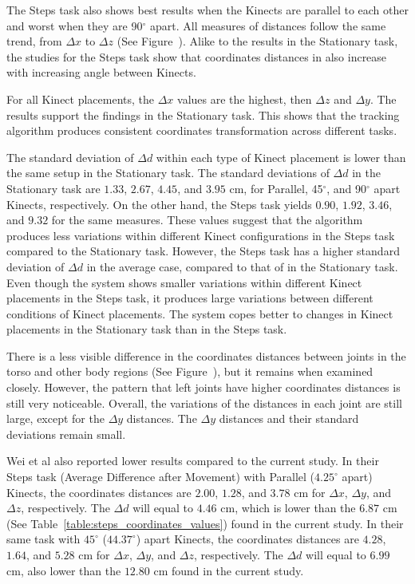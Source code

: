 The Steps task also shows best results when the Kinects are parallel to each other and worst when they are 90$^{\circ}$ apart. All measures of distances follow the same trend, from $\Delta x$ to $\Delta z$ (See Figure~). Alike to the results in the Stationary task, the studies for the Steps task show that coordinates distances in also increase with increasing angle between Kinects.

For all Kinect placements, the $\Delta x$ values are the highest, then $\Delta z$ and $\Delta y$. The results support the findings in the Stationary task. This shows that the tracking algorithm produces consistent coordinates transformation across different tasks.

The standard deviation of $\Delta d$ within each type of Kinect placement is lower than the same setup in the Stationary task. The standard deviations of $\Delta d$ in the Stationary task are $1.33$, $2.67$, $4.45$, and $3.95$ cm, for Parallel, 45$^{\circ}$, and 90$^{\circ}$ apart Kinects, respectively. On the other hand, the Steps task yields $0.90$, $1.92$, $3.46$, and $9.32$ for the same measures. These values suggest that the algorithm produces less variations within different Kinect configurations in the Steps task compared to the Stationary task. However, the Steps task has a higher standard deviation of $\Delta d$ in the average case, compared to that of in the Stationary task. Even though the system shows smaller variations within different Kinect placements in the Steps task, it produces large variations between different conditions of Kinect placements. The system copes better to changes in Kinect placements in the Stationary task than in the Steps task.

There is a less visible difference in the coordinates distances between joints in the torso and other body regions (See Figure~), but it remains when examined closely. However, the pattern that left joints have higher coordinates distances is still very noticeable. Overall, the variations of the distances in each joint are still large, except for the $\Delta y$ distances. The $\Delta y$ distances and their standard deviations remain small.

Wei et al also reported lower results compared to the current study. In their Steps task (Average Difference after Movement) with Parallel ($4.25^{\circ}$ apart) Kinects, the coordinates distances are $2.00$, $1.28$, and $3.78$ cm for $\Delta x$, $\Delta y$, and $\Delta z$, respectively. The $\Delta d$ will equal to $4.46$ cm, which is lower than the $6.87$ cm (See Table~\ref{table:steps_coordinates_values}) found in the current study. In their same task with $45^{\circ}$ ($44.37^{\circ}$) apart Kinects, the coordinates distances are $4.28$, $1.64$, and $5.28$ cm for $\Delta x$, $\Delta y$, and $\Delta z$, respectively. The $\Delta d$ will equal to $6.99$ cm, also lower than the $12.80$ cm found in the current study.


